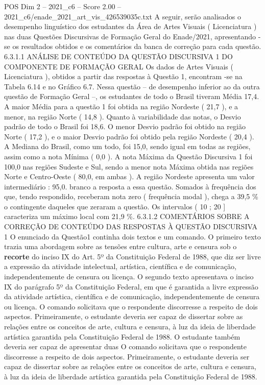 \begin{textsample}{POS Dim 2 – 2021\_c6 – Score 2.00 – 2021\_c6/enade\_2021\_art\_vis\_426539035c.txt}
A seguir, serão analisados o desempenho linguístico dos estudantes da Área de Artes Visuais ( Licenciatura ) nas duas Questões Discursivas de Formação Geral do Enade/2021, apresentando -se os resultados obtidos e os comentários da banca de correção para cada questão. 6.3.1.1 ANÁLISE DE CONTEÚDO DA QUESTÃO DISCURSIVA 1 DO COMPONENTE DE FORMAÇÃO GERAL Os dados de Artes Visuais ( Licenciatura ), obtidos a partir das respostas à Questão 1, encontram -se na Tabela 6.14 e no Gráfico 6.7.
Nessa questão – de desempenho inferior ao da outra questão de Formação Geral –, os estudantes de todo o Brasil tiveram Média 17,4.
A maior Média para a questão 1 foi obtida na região Nordeste ( 21,7 ), e a menor, na região Norte ( 14,8 ).
Quanto à variabilidade das notas, o Desvio padrão de todo o Brasil foi 18,6.
O menor Desvio padrão foi obtido na região Norte ( 17,2 ), e o maior Desvio padrão foi obtido pela região Nordeste ( 20,4 ).
A Mediana do Brasil, como um todo, foi 15,0, sendo igual em todas as regiões, assim como a nota Mínima ( 0,0 ).
A nota Máxima da Questão Discursiva 1 foi 100,0 nas regiões Sudeste e Sul, sendo a menor nota Máxima obtida nas regiões Norte e Centro-Oeste ( 80,0, em ambas ).
A região Nordeste apresenta um valor intermediário : 95,0. branco a resposta a essa questão.
Somados à frequência dos que, tendo respondido, receberam nota zero ( frequência modal ), chega a 39,5 \% o contingente daqueles que zeraram a questão.
Os intervalos ( 10 ; 20 ] caracteriza um máximo local com 21,9 \%. 6.3.1.2 COMENTÁRIOS SOBRE A CORREÇÃO DE CONTEÚDO DAS RESPOSTAS À QUESTÃO DISCURSIVA 1 O enunciado da Questão1 continha dois textos e um comando.
O primeiro texto trazia uma abordagem sobre as tensões entre cultura, arte e censura sob o \textbf{recorte} do inciso IX do Art. 5º da Constituição Federal de 1988, que diz ser livre a expressão da atividade intelectual, artística, científica e de comunicação, independentemente de censura ou licença.
O segundo texto apresentava o inciso IX do parágrafo 5º da Constituição Federal, em que é garantida a livre expressão da atividade artística, científica e de comunicação, independentemente de censura ou licença.
O comando solicitava que o respondente discorresse a respeito de dois aspectos.
Primeiramente, o estudante deveria ser capaz de dissertar sobre as relações entre os conceitos de arte, cultura e censura, à luz da ideia de liberdade artística garantida pela Constituição Federal de 1988.
O estudante também deveria ser capaz de apresentar duas O comando solicitava que o respondente discorresse a respeito de dois aspectos.
Primeiramente, o estudante deveria ser capaz de dissertar sobre as relações entre os conceitos de arte, cultura e censura, à luz da ideia de liberdade artística garantida pela Constituição Federal de 1988.

\end{textsample}
